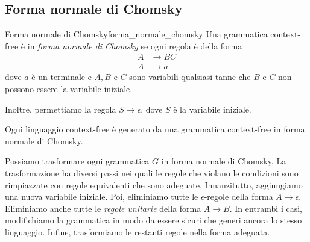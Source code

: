 \documentclass[12pt]{report}
\newcounter{theorem}
\newcounter{definition}
\newcommand{\nmu}{}
\begin{document}
\subsection{Forma normale di Chomsky}
\begin{definition}{\nmu Forma normale di Chomsky}{forma_normale_chomsky}
	Una grammatica context-free è in \textit{forma normale di Chomsky} se ogni regola è della forma
	\begin{align*}
		A &\to BC \\
		A &\to a
	\end{align*}
	dove $a$ è un terminale e $A, B$ e $C$ sono variabili qualsiasi tanne che $B$ e $C$ non possono essere la variabile iniziale.

	Inoltre, permettiamo la regola $S \to \epsilon$, dove $S$ è la variabile iniziale.
\end{definition}
\begin{theorem}{}{}
	Ogni linguaggio context-free è generato da una grammatica context-free in forma normale di Chomsky.
\end{theorem}
Possiamo trasformare ogni grammatica  $G$ in forma normale di Chomsky. La trasformazione ha diversi passi nei quali le regole che violano le condizioni sono rimpiazzate con regole equivalenti che sono adeguate. Innanzitutto, aggiungiamo una nuova variabile iniziale. Poi, eliminiamo tutte le $\epsilon$-regole della forma $A \to \epsilon$. Eliminiamo anche tutte le \textit{regole unitarie} della forma $A \to B$. In entrambi i casi, modifichiamo la grammatica in modo da essere sicuri che generi ancora lo stesso linguaggio. Infine, trasformiamo le restanti regole nella forma adeguata.
\end{document}
